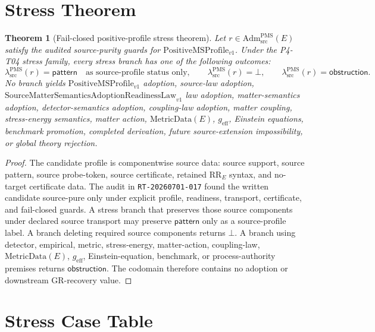 \documentclass[11pt]{article}
\newcommand{\SMSAR}{\mathrm{SourceMatterSemanticsAdoptionReadinessLaw}_{v1}}
\newcommand{\PMSProf}{\mathrm{PositiveMSProfile}_{v1}}
\newcommand{\AdmPMS}{\mathrm{Adm}^{\mathrm{PMS}}_{\mathrm{src}}}
\newcommand{\lambdaProf}{\lambda^{\mathrm{PMS}}_{\mathrm{src}}}
\newcommand{\Pattern}{\mathsf{pattern}}
\newcommand{\Obstruction}{\mathsf{obstruction}}
\newcommand{\Bottom}{\bot}
\newcommand{\RRE}{\mathrm{RR}_E}
\newcommand{\MetricData}{\mathrm{MetricData}}
\newcommand{\geff}{g_{\mathrm{eff}}}
\newtheorem{theorem}{Theorem}
\begin{document}
\section{Stress Theorem}

\begin{theorem}[Fail-closed positive-profile stress theorem]
Let \(r\in\AdmPMS(E)\) satisfy the audited source-purity guards for
\(\PMSProf\). Under the P4-T04 stress family, every stress branch has one of
the following outcomes:
\[
  \lambdaProf(r)=\Pattern\quad\text{as source-profile status only},
  \qquad
  \lambdaProf(r)=\Bottom,
  \qquad
  \lambdaProf(r)=\Obstruction.
\]
No branch yields \(\PMSProf\) adoption, source-law adoption,
\(\SMSAR\) law adoption, matter-semantics adoption, detector-semantics
adoption, coupling-law adoption, matter coupling, stress-energy semantics,
matter action, \(\MetricData(E)\), \(\geff\), Einstein equations, benchmark
promotion, completed derivation, future source-extension impossibility, or
global theory rejection.
\end{theorem}

\begin{proof}
The candidate profile is componentwise source data: source support, source
pattern, source probe-token, source certificate, retained \(\RRE\) syntax, and
no-target certificate data. The audit in \texttt{RT-20260701-017} found the
written candidate source-pure only under explicit profile, readiness,
transport, certificate, and fail-closed guards. A stress branch that preserves
those source components under declared source transport may preserve
\(\Pattern\) only as a source-profile label. A branch deleting required source
components returns \(\Bottom\). A branch using detector, empirical, metric,
stress-energy, matter-action, coupling-law, \(\MetricData(E)\), \(\geff\),
Einstein-equation, benchmark, or process-authority premises returns
\(\Obstruction\). The codomain therefore contains no adoption or downstream
GR-recovery value.
\end{proof}

\section{Stress Case Table}
\end{document}
